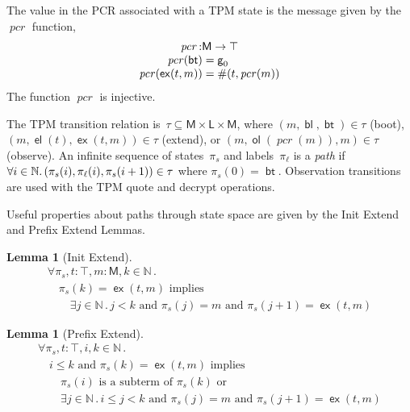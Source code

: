 \documentclass[12pt]{article}
\newtheorem{lem}[thm]{Lemma}
\newcommand{\cn}[1]{\ensuremath{\operatorname{\mathsf{#1}}}}
\newcommand{\fn}[1]{\ensuremath{\operatorname{\mathit{#1}}}}
\newcommand{\srt}[1]{\ensuremath{\mathsf{#1}}}
\newcommand{\typ}{\mathbin:}
\newcommand{\nat}{\ensuremath{\mathbb{N}}}
\newcommand{\all}[1]{\forall#1\mathpunct.}
\newcommand{\some}[1]{\exists#1\mathpunct.}
\newcommand{\boot}{\cn{bt}}
\newcommand{\extend}{\cn{ex}}
\newcommand{\bootl}{\cn{bl}}
\newcommand{\extendl}{\cn{el}}
\newcommand{\observl}{\cn{ol}}
\newcommand{\tran}{\ensuremath{\tau}}
\newcommand{\pth}{\ensuremath{\pi}}
\newcommand{\pcr}{\fn{pcr}}
\begin{document}
The value in the PCR associated with a TPM state is the message
given by the {\pcr} function,
$$\begin{array}{r@{{}={}}l}
\multicolumn{2}{c}{\pcr\typ\srt{M}\to\top}\\
\pcr(\boot)&\cn{g}_0\\
\pcr(\extend(t, m))&\#(t,\pcr(m))
\end{array}$$
The function {\pcr} is injective.

The TPM transition relation
is~$\tran\subseteq\srt{M}\times\srt{L}\times\srt{M}$, where
$(m,\bootl,\boot)\in\tran$ (boot), $(m,\extendl(t),\extend(t,m))\in\tran$
(extend), or $(m,\observl(\pcr(m)), m)\in\tran$ (observe).  An infinite
sequence of states~$\pth_s$ and labels~$\pth_\ell$ is a \emph{path} if
$\all{i\in\nat}(\pth_s(i),\pth_\ell(i),\break\pth_s(i+1))\in\tran$
where $\pth_s(0)=\boot$.  Observation transitions are used with the
TPM quote and decrypt operations.

Useful properties about paths through state space are given by the Init
Extend and Prefix Extend Lemmas.


\begin{lem}[Init Extend]\label{lem:init extend}
\begingroup\rm
$$\begin{array}{l}
\all{\pth_s,t\typ\top,m\typ\srt{M},k\in\nat}\\
\quad\mbox{$\pth_s(k)=\extend(t,m)$ implies}\\
\qquad\some{j\in\nat}
\mbox{$j<k$ and $\pth_s(j)=m$ and $\pth_s(j+1)=\extend(t,m)$}
\end{array}$$
\endgroup
\end{lem}


\begin{lem}[Prefix Extend]\label{lem:prefix extend}
\begingroup\rm
$$\begin{array}{l}
\all{\pth_s,t\typ\top,i,k\in\nat}\\
\quad\mbox{$i\leq k$ and $\pth_s(k)=\extend(t,m)$ implies}\\
\qquad\mbox{$\pth_s(i)$ is a subterm of $\pth_s(k)$ or}\\
\qquad\some{j\in\nat}
\mbox{$i\leq j<k$ and $\pth_s(j)=m$ and $\pth_s(j+1)=\extend(t,m)$}
\end{array}$$
\endgroup
\end{lem}
\end{document}
